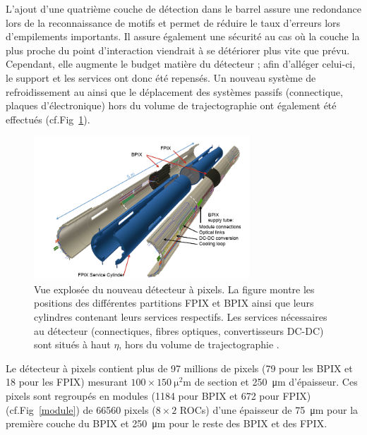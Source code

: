 L'ajout d'une quatrième couche de détection dans le barrel assure une redondance lors de la reconnaissance de motifs et permet de réduire le taux d'erreurs lors d'empilements importants. Il assure également une sécurité au cas où la couche la plus proche du point d'interaction viendrait à se détériorer plus vite que prévu. Cependant, elle augmente le budget matière du détecteur ; afin d'alléger celui-ci, le support et les services ont donc été repensés. Un nouveau système de refroidissement au  ainsi que le déplacement des systèmes passifs (connectique, plaques d'électronique) hors du volume de trajectographie ont également été effectués (cf.Fig~\ref{pixel2}).

\begin{figure}[ht!]
	\centering
	\includegraphics[width=0.72\textwidth]{CMS/pixel3.png}
	\captionsetup{type=figure}\caption{Vue explosée du nouveau détecteur à pixels. La figure montre les positions des différentes partitions FPIX et BPIX ainsi que leurs cylindres contenant leurs services respectifs. Les services nécessaires au détecteur (connectiques, fibres optiques, convertisseurs DC-DC) sont situés à haut $\eta$, hors du volume de trajectographie \cite{Dominguez:1481838}.}
	\label{pixel2}
\end{figure}

Le détecteur à pixels contient plus de \num{97} millions de pixels (\num{79} pour les BPIX et \num{18} pour les FPIX) mesurant $\num{100}\times\SI{150}{\square\micro\meter}$ de section et \SI{250}{\micro\meter} d'épaisseur. Ces pixels sont regroupés en modules (\num{1184} pour BPIX et \num{672} pour FPIX) (cf.Fig~\ref{module}) de \num{66560} pixels  ($\num{8}\times\num{2}$ ROCs) d'une épaisseur de \SI{75}{\micro\meter} pour la première couche du BPIX et \SI{250}{\micro\meter} pour le reste des BPIX et des FPIX.

